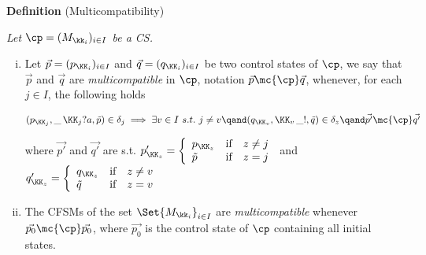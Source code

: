 {\bf Definition} (Multicompatibility) {\em  Let $\cp=(M_{\kk_i})_{i\in I}$ be a CS.
\vspace{-1mm}
  \begin{enumerate}[i)]
  \item
    Let   $\vec{p}= (p_{\KK_i})_{i\in I}$
  and $\vec{q}= (q_{\KK_i})_{i\in I}$  be  two control states of $\cp$,
   we say that $\vec{p}$ and $\vec{q}$ are {\em multicompatible} in $\cp$, 
   notation $\vec{p}\mc{\cp}\vec{q}$,
  whenever, for each  $j\in I$, the following holds\\
  \centerline{$ (p_{\KK_j},\_\,\KK_j?a,\tilde p)\in\delta_j \implies \exists v\in I\ s.t. \ j\neq v \qand (q_{\KK_v},\KK_v\,\_!,\tilde q)\in \delta_z \qand \vec{p'}\mc{\cp}\vec{q'}$}
  where $\vec{p'}$ and $\vec{q'}$  are s.t. $p'_{\KK_z} = \left\{\begin{array}{lll}
                                                                                p_{\KK_z} & \text{if} & z\neq j\\
                                                                                \tilde p   & \text{if} & z= j
                                                                                \end{array}
                                                                       \right.$
                                                                       and\
                                                  $q'_{\KK_z} = \left\{\begin{array}{lll}
                                                                                q_{\KK_z} & \text{if} & z\neq v\\
                                                                                \tilde q   & \text{if} & z= v
                                                                                \end{array}
                                                                       \right.$   
  \item The CFSMs  of the set $\Set{M_{\kk_i}}_{i\in I}$ are {\em multicompatible}
  whenever $\vec{p_0}\mc{\cp}\vec{p_0}$, where
  $\vec{p_0}$ is the control state of $\cp$ containing all initial states.
  \end{enumerate}
  }
  
